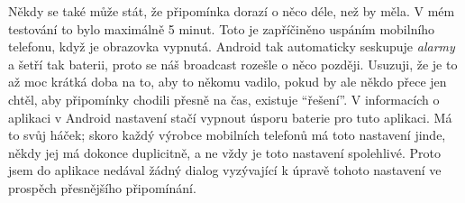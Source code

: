 \documentclass[../TakeYourPill.tex]{subfiles}
\begin{document}
Někdy se také může stát, že připomínka dorazí o něco déle, než by měla. V mém testování to bylo maximálně 5 minut. Toto je zapříčiněno uspáním mobilního telefonu, když je obrazovka vypnutá. Android tak automaticky seskupuje \textit{alarmy} a šetří tak baterii, proto se náš broadcast rozešle o něco později. Usuzuji, že je to až moc krátká doba na to, aby to někomu vadilo, pokud by ale někdo přece jen chtěl, aby připomínky chodili přesně na čas, existuje \enquote{řešení}. V informacích o aplikaci v Android nastavení stačí vypnout úsporu baterie pro tuto aplikaci. Má to svůj háček; skoro každý výrobce mobilních telefonů má toto nastavení jinde, někdy jej má dokonce duplicitně, a ne vždy je toto nastavení spolehlivé. Proto jsem do aplikace nedával žádný dialog vyzývající k úpravě tohoto nastavení ve prospěch přesnějšího připomínání.
\end{document}
